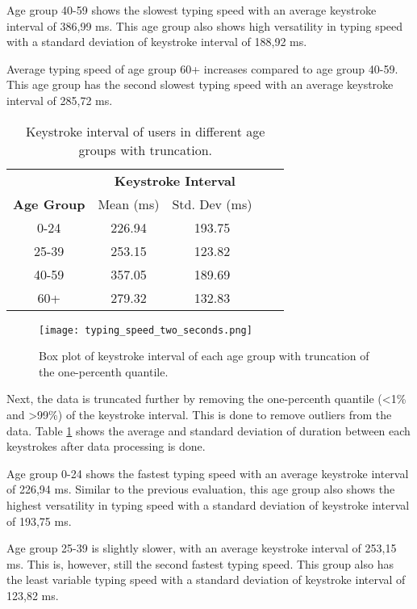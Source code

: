 Age group 40-59 shows the slowest typing speed with an average keystroke interval of 386,99 ms.
This age group also shows high versatility in typing speed with a standard deviation of keystroke interval of 188,92 ms.

Average typing speed of age group 60+ increases compared to age group 40-59.
This age group has the second slowest typing speed with an average keystroke interval of 285,72 ms.

\begin{table}[h]
    \centering
    \begin{tabular}{ccccc}
    \toprule
    \multicolumn{1}{c}{} & \multicolumn{2}{c}{\textbf{Keystroke Interval}}\\
    \cmidrule(rl){2-3} \cmidrule(rl){4-5}
    \textbf{Age Group} & {Mean (ms)} & {Std. Dev (ms)} \\
    \midrule
    0-24 & 226.94 & 193.75 \\
    25-39 & 253.15 & 123.82  \\
    40-59 & 357.05 & 189.69 \\
    60+ & 279.32 & 132.83 \\
    \bottomrule
    \end{tabular}
    \caption{Keystroke interval of users in different age groups with truncation.}
    \label{tab:typing_behavior_one}
\end{table}

\begin{figure}[h!]
    \centering
    \texttt{[image: typing\_speed\_two\_seconds.png]}
    \caption{Box plot of keystroke interval of each age group with truncation of the one-percenth quantile.}
    \label{box_plot_typing_speed_two_seconds}
\end{figure}

Next, the data is truncated further by removing the one-percenth quantile (\textless1\% and \textgreater99\%) of the keystroke interval.
This is done to remove outliers from the data.
Table \ref{tab:typing_behavior_one} shows the average and standard deviation of duration between each keystrokes after data processing is done.

Age group 0-24 shows the fastest typing speed with an average keystroke interval of 226,94 ms.
Similar to the previous evaluation, this age group also shows the highest versatility in typing speed with a standard deviation of keystroke interval of 193,75 ms.

Age group 25-39 is slightly slower, with an average keystroke interval of 253,15 ms.
This is, however, still the second fastest typing speed.
This group also has the least variable typing speed with a standard deviation of keystroke interval of 123,82 ms.

